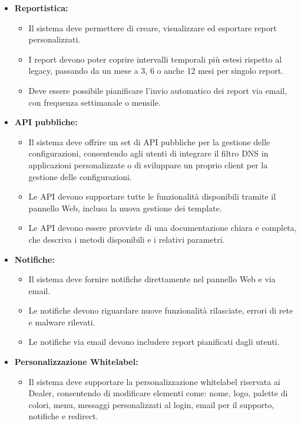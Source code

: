 \begin{itemize}
  \item \textbf{Reportistica:}
    \begin{itemize}
      \item Il sistema deve permettere di creare, visualizzare ed esportare report personalizzati.
      \item I report devono poter coprire intervalli temporali più estesi rispetto al legacy, passando da un mese a 3, 6 o anche 12 mesi per singolo report.
      \item Deve essere possibile pianificare l’invio automatico dei report via email, con frequenza settimanale o mensile.
    \end{itemize}
    \newpage
  \item \textbf{API pubbliche:}
    \begin{itemize}
      \item Il sistema deve offrire un set di API pubbliche per la gestione delle configurazioni, consentendo agli utenti di integrare il filtro DNS in applicazioni personalizzate o di sviluppare un proprio client per la gestione delle configurazioni.
      \item Le API devono supportare tutte le funzionalità disponibili tramite il pannello Web, inclusa la nuova gestione dei template.
      \item Le API devono essere provviste di una documentazione chiara e completa, che descriva i metodi disponibili e i relativi parametri.
    \end{itemize}

  \item \textbf{Notifiche:}
    \begin{itemize}
      \item Il sistema deve fornire notifiche direttamente nel pannello Web e via email.
      \item Le notifiche devono riguardare nuove funzionalità rilasciate, errori di rete e malware rilevati.
      \item Le notifiche via email devono includere report pianificati dagli utenti.
    \end{itemize}

  \item \textbf{Personalizzazione Whitelabel:}
    \begin{itemize}
      \item Il sistema deve supportare la personalizzazione whitelabel riservata ai Dealer, consentendo di modificare elementi come: nome, logo, palette di colori, menu, messaggi personalizzati al login, email per il supporto, notifiche e redirect.
    \end{itemize}


\end{itemize}
